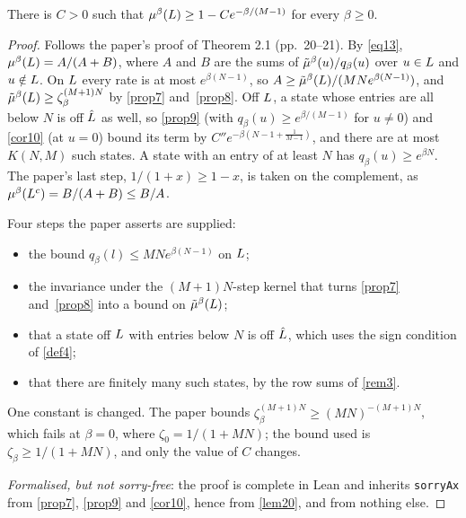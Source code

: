 \begin{theorem}
  \label{thm2-1}
  \leanok
  There is $C > 0$ such that $\mu^\beta(L) \ge 1 - C e^{-\beta/(M-1)}$ for
  every $\beta \ge 0$.
\end{theorem}
\begin{proof}
  \leanok
  Follows the paper's proof of Theorem 2.1 (pp.~20--21).  By \ref{eq13},
  $\mu^\beta(L) = A/(A+B)$, where $A$ and $B$ are the sums of
  $\tilde{\mu}^\beta(u)/q_\beta(u)$ over $u \in L$ and $u \notin L$.  On
  $L$ every rate is at most $e^{\beta(N-1)}$, so $A \ge \tilde{\mu}^\beta(L)
  / (MN e^{\beta(N-1)})$, and $\tilde{\mu}^\beta(L) \ge \zeta_\beta^{(M+1)N}$ by
  \ref{prop7} and~\ref{prop8}.  Off $L$, a state whose entries are all
  below $N$ is off $\hat{L}$ as well, so \ref{prop9} (with $q_\beta(u)
  \ge e^{\beta/(M-1)}$ for $u \ne 0$) and \ref{cor10} (at $u = 0$) bound its
  term by $C'' e^{-\beta(N-1+\frac{1}{M-1})}$, and there are at most
  $K(N,M)$ such states.  A state with an entry of at least $N$ has $q_\beta(u)
  \ge e^{\beta N}$.  The paper's last step, $1/(1+x) \ge 1-x$, is taken on the
  complement, as $\mu^\beta(L^c) = B/(A+B) \le B/A$.

  Four steps the paper asserts are supplied:
  \begin{itemize}
    \item the bound $q_\beta(l) \le MN e^{\beta(N-1)}$ on $L$;
    \item the invariance under the $(M+1)N$-step kernel that turns \ref{prop7}
      and~\ref{prop8} into a bound on $\tilde{\mu}^\beta(L)$;
    \item that a state off $L$ with entries below $N$ is off
      $\hat{L}$, which uses the sign condition of \ref{def4};
    \item that there are finitely many such states, by the row sums of
      \ref{rem3}.
  \end{itemize}
  One constant is changed.  The paper bounds $\zeta_\beta^{(M+1)N} \ge
  (MN)^{-(M+1)N}$, which fails at $\beta = 0$, where $\zeta_0 = 1/(1+MN)$; the
  bound used is $\zeta_\beta \ge 1/(1+MN)$, and only the value of $C$ changes.

  \emph{Formalised, but not sorry-free}: the proof is complete in Lean and
  inherits \texttt{sorryAx} from \ref{prop7}, \ref{prop9} and \ref{cor10},
  hence from \ref{lem20}, and from nothing else.
\end{proof}

